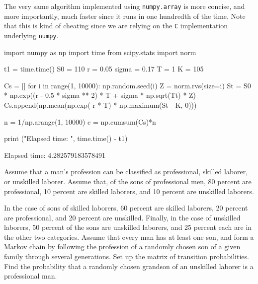 \begin{solution}
The very same algorithm implemented using \texttt{numpy.array} is more concise, and more importantly, much faster since it runs in one hundredth of the time. Note that this is kind of cheating since we are relying on the \texttt{C} implementation underlying \texttt{numpy}.

\begin{ipython}
import numpy as np
import time
from scipy.stats import norm

t1 = time.time()
S0 = 110
r = 0.05
sigma = 0.17
T = 1
K = 105

Cs = []
for i in range(1, 10000):
  np.random.seed(i)
  Z = norm.rvs(size=i)
  St = S0 * np.exp((r - 0.5 * sigma ** 2) * T + sigma * np.sqrt(Tt) * Z)
  Cs.append(np.mean(np.exp(-r * T) * np.maximum(St - K, 0)))

n = 1/np.arange(1, 10000)
c = np.cumsum(Cs)*n

print ("Elapsed time: ", time.time() - t1)
\end{ipython}
\begin{ioutput}
Elapsed time:  4.282579183578491
\end{ioutput}
\end{solution}

\begin{question}
Assume that a man’s profession can be classified as professional, skilled laborer, or unskilled laborer. Assume that, of the sons of professional men, 80 percent are professional, 10 percent are skilled laborers, and 10 percent are unskilled laborers.

In the case of sons of skilled laborers, 60 percent are skilled laborers, 20 percent are professional, and 20 percent are unskilled. Finally, in the case of unskilled laborers, 50 percent of the sons are unskilled laborers, and 25 percent each are in the other two categories. Assume that every man has at least one son, and form a Markov chain by following the profession of a randomly chosen son of a given family through several generations. Set up the matrix of transition probabilities. Find the probability that a randomly chosen grandson of an unskilled laborer is a professional man.
\end{question}

